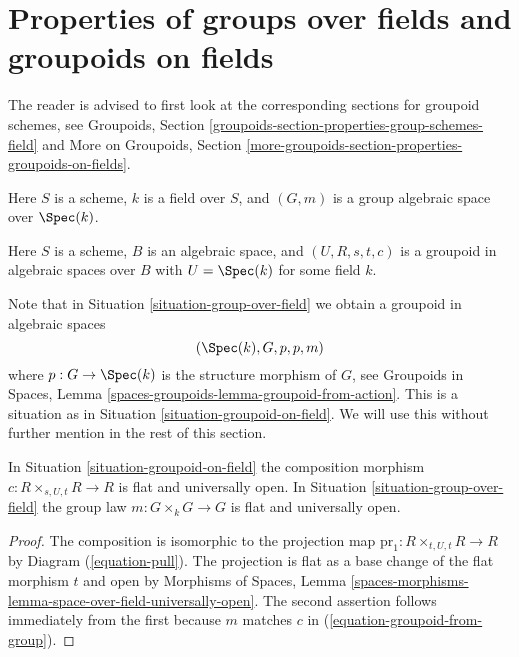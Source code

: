 \section{Properties of groups over fields and groupoids on fields}
\label{section-properties-groupoids-on-fields}

\noindent
The reader is advised to first look at the corresponding sections for
groupoid schemes, see
Groupoids, Section \ref{groupoids-section-properties-group-schemes-field}
and
More on Groupoids,
Section \ref{more-groupoids-section-properties-groupoids-on-fields}.

\begin{situation}
\label{situation-group-over-field}
Here $S$ is a scheme, $k$ is a field over $S$, and
$(G, m)$ is a group algebraic space over $\Spec(k)$.
\end{situation}

\begin{situation}
\label{situation-groupoid-on-field}
Here $S$ is a scheme, $B$ is an algebraic space, and
$(U, R, s, t, c)$ is a groupoid in algebraic spaces over $B$
with $U = \Spec(k)$ for some field $k$.
\end{situation}

\noindent
Note that in
Situation \ref{situation-group-over-field}
we obtain a groupoid in algebraic spaces
\begin{equation}
\label{equation-groupoid-from-group}
(\Spec(k), G, p, p, m)
\end{equation}
where $p : G \to \Spec(k)$ is the structure morphism of $G$, see
Groupoids in Spaces, Lemma \ref{spaces-groupoids-lemma-groupoid-from-action}.
This is a situation as in
Situation \ref{situation-groupoid-on-field}.
We will use this without further mention in the rest of this section.

\begin{lemma}
\label{lemma-groupoid-on-field-open-multiplication}
In
Situation \ref{situation-groupoid-on-field}
the composition morphism $c : R \times_{s, U, t} R \to R$ is flat and
universally open.
In
Situation \ref{situation-group-over-field}
the group law $m : G \times_k G \to G$ is flat and
universally open.
\end{lemma}

\begin{proof}
The composition is isomorphic to the projection map
$\text{pr}_1 : R \times_{t, U, t} R \to R$ by
Diagram (\ref{equation-pull}).
The projection is flat as a base change of the flat morphism $t$
and open by
Morphisms of Spaces,
Lemma \ref{spaces-morphisms-lemma-space-over-field-universally-open}.
The second assertion follows immediately from the first because
$m$ matches $c$ in (\ref{equation-groupoid-from-group}).
\end{proof}

